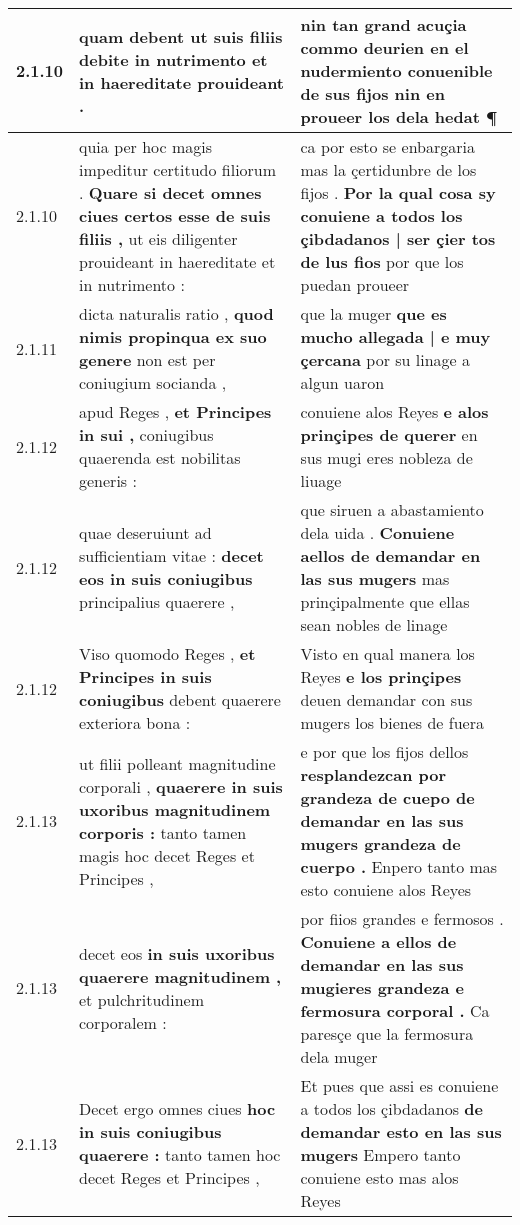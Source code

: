 \begin{tabular}{|p{1cm}|p{6.5cm}|p{6.5cm}|}
2.1.10 & quam debent \textbf{ ut suis filiis debite in nutrimento } et in haereditate prouideant . & nin tan grand acuçia \textbf{ commo deurien en el nudermiento conuenible de sus fijos } nin en proueer los dela hedat ¶ \\\hline
2.1.10 & quia per hoc magis impeditur certitudo filiorum . \textbf{ Quare si decet omnes ciues certos esse de suis filiis , } ut eis diligenter prouideant in haereditate et in nutrimento : & ca por esto se enbargaria mas la çertidunbre de los fijos . \textbf{ Por la qual cosa sy conuiene a todos los çibdadanos | ser çier tos de lus fios } por que los puedan proueer \\\hline
2.1.11 & dicta naturalis ratio , \textbf{ quod nimis propinqua ex suo genere } non est per coniugium socianda , & que la muger \textbf{ que es mucho allegada | e muy çercana } por su linage a algun uaron \\\hline
2.1.12 & apud Reges , \textbf{ et Principes in sui , } coniugibus quaerenda est nobilitas generis : & conuiene alos Reyes \textbf{ e alos prinçipes de querer } en sus mugi eres nobleza de liuage \\\hline
2.1.12 & quae deseruiunt ad sufficientiam vitae : \textbf{ decet eos in suis coniugibus } principalius quaerere , & que siruen a abastamiento dela uida . \textbf{ Conuiene aellos de demandar en las sus mugers } mas prinçipalmente que ellas sean nobles de linage \\\hline
2.1.12 & Viso quomodo Reges , \textbf{ et Principes in suis coniugibus } debent quaerere exteriora bona : & Visto en qual manera los Reyes \textbf{ e los prinçipes } deuen demandar con sus mugers los bienes de fuera \\\hline
2.1.13 & ut filii polleant magnitudine corporali , \textbf{ quaerere in suis uxoribus magnitudinem corporis : } tanto tamen magis hoc decet Reges et Principes , & e por que los fijos dellos \textbf{ resplandezcan por grandeza de cuepo de demandar en las sus mugers grandeza de cuerpo . } Enpero tanto mas esto conuiene alos Reyes \\\hline
2.1.13 & decet eos \textbf{ in suis uxoribus quaerere magnitudinem , } et pulchritudinem corporalem : & por fiios grandes e fermosos . \textbf{ Conuiene a ellos de demandar en las sus mugieres grandeza e fermosura corporal . } Ca paresçe que la fermosura dela muger \\\hline
2.1.13 & Decet ergo omnes ciues \textbf{ hoc in suis coniugibus quaerere : } tanto tamen hoc decet Reges et Principes , & Et pues que assi es conuiene a todos los çibdadanos \textbf{ de demandar esto en las sus mugers } Empero tanto conuiene esto mas alos Reyes \\\hline

\end{tabular}
